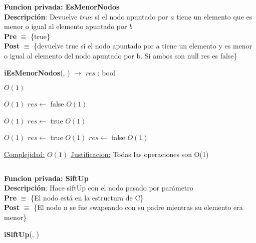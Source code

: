 \begin{Algoritmos}
\textbf{Funcion privada: EsMenorNodos}\\
\textbf{Descripci\'on}: Devuelve $true$ si el nodo apuntado por $a$ tiene un elemento que es menor o igual al elemento apuntado por $b$\\
\textbf{Pre} $\equiv$ \{true\}\\%
\textbf{Post} $\equiv$ \{devuelve true si el nodo apuntado por a tiene un elemento y es menor o igual al elemento del nodo apuntado por b. Si ambos son null res es false\}%
\begin{algorithm}[H]
{\textbf{iEsMenorNodos}(, ) $\to$ $res$ : bool}
\begin{algorithmic}[1]

     \Comment $O(1)$

          \Comment $O(1)$
            \State $res \gets$ false  \Comment $O(1)$
        \Else

              \Comment $O(1)$
                \State $res \gets$ true  \Comment $O(1)$
                
            \Else

                  \Comment $O(1)$
                    \State $res \gets$ true  \Comment $O(1)$
                \EndIf
            \EndIf
        \EndIf
    \Else
        \State $res \gets$ false  \Comment $O(1)$
    \EndIf


    \medskip
    \Statex \underline{Complejidad:} $O(1)$
    \Statex \underline{Justificacion:} Todas las operaciones son O(1)

\end{algorithmic}
\end{algorithm}



$ $\newline

\textbf{Funcion privada: SiftUp}\\
\textbf{Descripci\'on}: Hace siftUp con el nodo pasado por par\'ametro\\
\textbf{Pre} $\equiv$ \{El nodo est\'a en la estructura de C\}\\%
\textbf{Post} $\equiv$ \{El nodo n se fue swapeando con su padre mientras su elemento era menor\}%
\begin{algorithm}[H]
{\textbf{iSiftUp}(, )}
\begin{algorithmic}[1]


\end{algorithmic}
\end{algorithm}
\end{Algoritmos}
